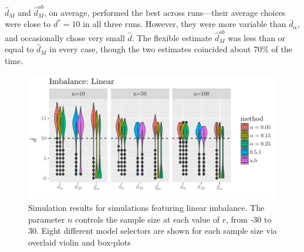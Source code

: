 \documentclass[sts]{imsart}\usepackage[]{graphicx}\usepackage[]{color}
\makeatletter
\def\maxwidth{ %
  \ifdim\Gin@nat@width>\linewidth
    \linewidth
  \else
    \Gin@nat@width
  \fi
}
\newcommand{\dalphaU}{\bar{d}_\alpha}
\newcommand{\dstar}{d^*}
\newcommand{\dhatm}{\hat{d}_M}
\newcommand{\dhatmab}{\hat{d}^{ab}_M}
\makeatother
\begin{document}
$\dhatm$ and $\dhatmab$, on average, performed the best across
runs---their average choices were close to $\dstar=10$ in all three
runs.
However, they were more variable than $\dalphaU$, and occasionally
chose very small $\hat{d}$.
The flexible estimate $\dhatmab$ was less than or equal to $\dhatm$ in
every case, though the two estimates coincided about
70\% of the time.



\begin{figure}

\includegraphics[width=\maxwidth]{figure/linearImbalance-1} 

\caption{Simulation results for simulations featuring linear
  imbalance. The parameter $n$ controls the sample size at each value
  of $r$, from -30 to 30. Eight different model selectors are shown
  for each sample size via overlaid violin and box-plots}
\label{fig:linImb}
\end{figure}
\end{document}
